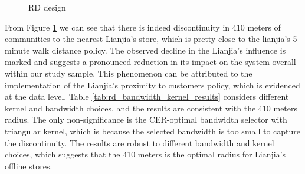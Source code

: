 \documentclass[11pt]{article}
\begin{document}
\begin{figure}[ht]
    \centering
    \hfill %
    \hfill %
    \caption{RD design}
    \label{fig:RD_design}
\end{figure}



From Figure \ref{fig:RD_design} we can see that there is indeed discontinuity in 410 meters of communities to the nearest Lianjia's store, which is pretty close to the lianjia's 5-minute walk distance policy. The observed decline in the Lianjia's influence is marked and suggests a pronounced reduction in its impact on the system overall within our study sample. This phenomenon can be attributed to the implementation of the Lianjia's proximity to customers policy, which is evidenced at the data level. Table \ref{tab:rd_bandwidth_kernel_results} considers different kernel and bandwidth choices, and the results are consistent with the 410 meters radius. The only non-significance is the CER-optimal bandwidth selector with triangular kernel, which is because the selected bandwidth is too small to capture the discontinuity. The results are robust to different bandwidth and kernel choices, which suggests that the 410 meters is the optimal radius for Lianjia's offline stores.
\end{document}

